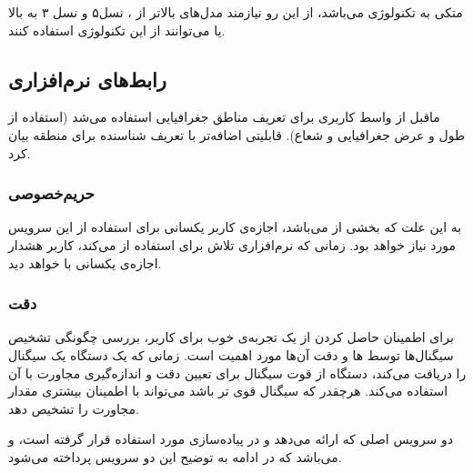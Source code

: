 \documentclass[oneside]{report}
\begin{document}
{\normalsize {}}
متکی به تکنولوژی 
{\normalsize {}} 
می‌باشد، از این رو نیازمند مدل‌های بالاتر از
{\normalsize {}}،
{\normalsize {}} 
نسل۵ و 
{\normalsize {}} 
نسل ۳ به بالا
یا 
{\normalsize {}}
می‌توانند از این تکنولوژی استفاده کنند.

\subsection{رابط‌های نرم‌افزاری {\normalsize {}}}
ماقبل 
{\normalsize {}}
از واسط کاربری 
{\normalsize {}}
برای تعریف مناطق جغرافیایی 
	استفاده می‌شد  (استفاده از طول و عرض جغرافیایی و شعاع).
	{\normalsize {}}
	قابلیتی اضافه‌تر با تعریف شناسنده برای منطقه بیان کرد. 
	\subsubsection{ حریم‌خصوصی  }
	به این علت که 
	{\normalsize {}}
	بخشی از 
	{\normalsize {}}
	می‌باشد، اجازه‌ی کاربر یکسانی برای استفاده از این سرویس مورد نیاز خواهد بود. زمانی که نرم‌افزاری تلاش برای استفاده از 
	{\normalsize {}}
	می‌کند، کاربر هشدار اجازه‌ی یکسانی با 
	{\normalsize {}}
	خواهد دید. 
	
\subsubsection{دقت {\small {}}}
برای اطمینان حاصل کردن از یک تجربه‌ی خوب برای کاربر،  بررسی چگونگی تشخیص سیگنال‌ها توسط 
{\normalsize {}} ها 
و دقت آن‌ها مورد اهمیت است. زمانی که یک دستگاه 
{\normalsize {}}
یک سیگنال 
{\normalsize {}}
را دریافت می‌کند،   دستگاه از قوت سیگنال برای تعیین دقت و اندازه‌گیری مجاورت با آن استفاده می‌کند. هرچقدر که سیگنال قوی تر باشد 
{\normalsize {}}
می‌تواند با اطمینان بیشتری مقدار مجاورت را تشخیص دهد. 

دو سرویس اصلی که 
{\normalsize {}}
 ارائه می‌دهد  و در پیاده‌سازی مورد استفاده قرار گرفته است،
  {\normalsize {}} 
 و
  {\normalsize {}}
  می‌باشد که در ادامه به توضیح این دو سرویس پرداخته می‌شود.
\end{document}
